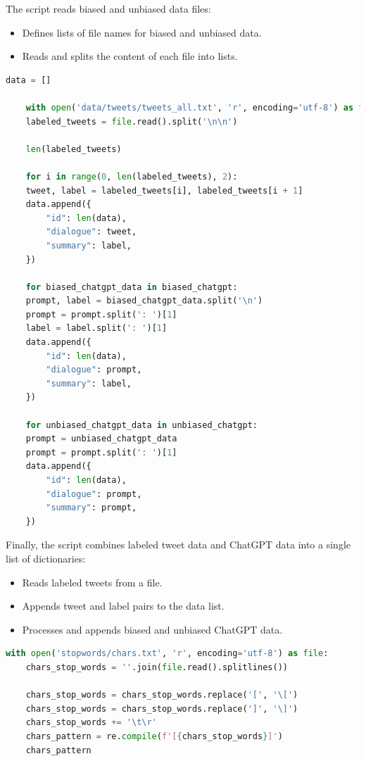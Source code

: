 \documentclass{solutionclass} %
\begin{document}
\begin{solution}
The script reads biased and unbiased data files:

\begin{itemize}
	\item Defines lists of file names for biased and unbiased data.
	\item Reads and splits the content of each file into lists.
\end{itemize}

\end{solution}

\begin{lstlisting}[language=Python]
	data = []
	
	with open('data/tweets/tweets_all.txt', 'r', encoding='utf-8') as file:
	labeled_tweets = file.read().split('\n\n')
	
	len(labeled_tweets)
	
	for i in range(0, len(labeled_tweets), 2):
	tweet, label = labeled_tweets[i], labeled_tweets[i + 1]
	data.append({
		"id": len(data),
		"dialogue": tweet,
		"summary": label,
	})
	
	for biased_chatgpt_data in biased_chatgpt:
	prompt, label = biased_chatgpt_data.split('\n')
	prompt = prompt.split(': ')[1]
	label = label.split(': ')[1]
	data.append({
		"id": len(data),
		"dialogue": prompt,
		"summary": label,
	})
	
	for unbiased_chatgpt_data in unbiased_chatgpt:
	prompt = unbiased_chatgpt_data
	prompt = prompt.split(': ')[1]
	data.append({
		"id": len(data),
		"dialogue": prompt,
		"summary": prompt,
	})
\end{lstlisting}


\begin{solution}
Finally, the script combines labeled tweet data and ChatGPT data into a single list of dictionaries:

\begin{itemize}
	\item Reads labeled tweets from a file.
	\item Appends tweet and label pairs to the data list.
	\item Processes and appends biased and unbiased ChatGPT data.
\end{itemize}
\end{solution}


\begin{lstlisting}[language=Python]
	with open('stopwords/chars.txt', 'r', encoding='utf-8') as file:
	chars_stop_words = ''.join(file.read().splitlines())
	
	chars_stop_words = chars_stop_words.replace('[', '\[')
	chars_stop_words = chars_stop_words.replace(']', '\]')
	chars_stop_words += '\t\r'
	chars_pattern = re.compile(f'[{chars_stop_words}]')
	chars_pattern
\end{lstlisting}
\end{document}
